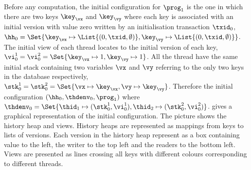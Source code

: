Before any computation, the initial configuration for $\prog_1$ is the one in which there are two keys \( \key_{\vx}\) and \( \key_{\vy} \) where each key is associated with an initial version with value zero written by an initialisation transaction $\txid_0$, \( \hh_{0} = \Set{\key_{\vx} \mapsto \List{(0, \txid, \emptyset)}, \key_{\vy} \mapsto \List{(0, \txid, \emptyset)}} \).
The initial view of each thread locates to the initial version of each key, \( \vi^{1}_{0} = \vi^{2}_{0} = \Set{\key_{\vx} \mapsto 1, \key_{\vy} \mapsto 1}\).
All the thread have the same initial stack containing two variables \( \vx \) and \( \vy \) referring to the only two keys in the database respectively, \ie \( \stk^{1}_{0} = \stk^{2}_{0} = \Set{\vx \mapsto \key_{\vx}, \vy \mapsto \key_{\vy}}\).
Therefore the initial configuration \( (\hh_{0}, \thdenv_{0}, \prog_{1}) \) where \( \thdenv_{0} = \Set{\thid_{1} \mapsto (\stk_{0}^{1}, \vi_{0}^{1}), \thid_{2} \mapsto (\stk_{0}^{2}, \vi_{0}^{2})}\).
 gives a graphical representation of the initial configuration.
The picture shows the history heap and views.
History heaps are represented as mappings from keys to lists of versions.
Each version in the history heap represent as a box containing value to the left, the writer to the top left and the readers to the bottom left.
Views are presented as lines crossing all keys with different colours corresponding to different threads.
 
